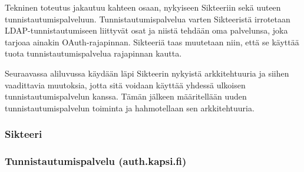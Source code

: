Tekninen toteutus jakautuu kahteen osaan, nykyiseen Sikteeriin sekä uuteen tunnistautumispalveluun. Tunnistautumispalvelua varten Sikteeristä irrotetaan LDAP-tunnistautumiseen liittyvät osat ja niistä tehdään oma palvelunsa, joka tarjoaa ainakin OAuth-rajapinnan. Sikteeriä taas muutetaan niin, että se käyttää tuota tunnistautumispalvelua rajapinnan kautta.

Seuraavassa aliluvussa käydään läpi Sikteerin nykyistä arkkitehtuuria ja siihen vaadittavia muutoksia, jotta sitä voidaan käyttää yhdessä ulkoisen tunnistautumispalvelun kanssa. Tämän jälkeen määritellään uuden tunnistautumispalvelun toiminta ja hahmotellaan sen arkkitehtuuria.

\subsubsection{Sikteeri}

\subsubsection{Tunnistautumispalvelu (auth.kapsi.fi)}
